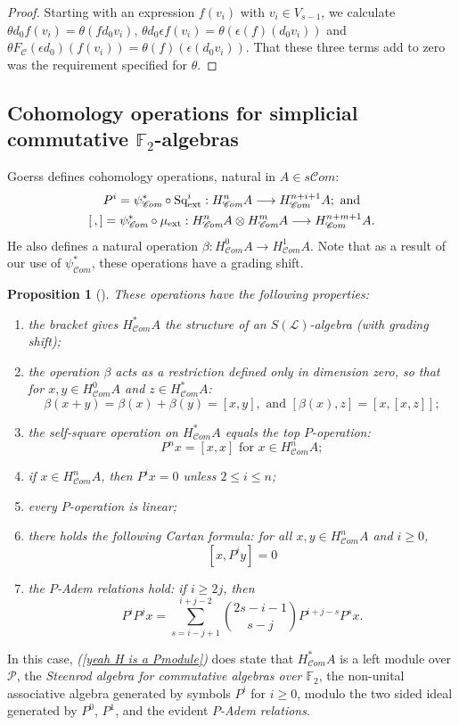 \documentclass[11pt]{amsart}
\theoremstyle{plain}
\newtheorem{prop}[thm]{Proposition}
\theoremstyle{definition}
\renewcommand{\to}{\longrightarrow}
\newcommand{\scrL}{\mathscr{L}}
\newcommand{\scrC}{\mathscr{C}}
\newcommand{\calP}{\mathcal{P}}
\newcommand{\calC}{\mathcal{C}}
\theoremstyle{plain}
\newcommand{\Palg}{{\calP}}
\newcommand{\LieOperad}{{\scrL}}
\newcommand{\ExtCohOp}{\textup{Sq}_\textup{ext}}
\newcommand{\ExtCohProd}{\mu_\textup{ext}}
\newcommand{\F}{\mathbb{F}}
\newcommand{\algs}{\scrC\!\textit{om}}
\begin{document}
\begin{Constructing homotopy and cohomotopy operations}
\begin{proof}
Starting with an expression $f(v_i)$ with $v_i\in V_{s-1}$, we calculate $\theta d_0 f(v_i)=\theta (fd_0v_i)$, $\theta d_0\epsilon f(v_i)=\theta (\epsilon (f)(d_0v_i))$ and $\theta F_{\calC}(\epsilon d_0)(f(v_i))=\theta(f)(\epsilon(d_0v_i))$. That these three terms add to zero was the requirement specified for $\theta$.
\end{proof}



\subsection{Cohomology operations for simplicial commutative $\F_2$-algebras}\label{The example of simplicial commutative F2-algebras}
Goerss \cite[\S5]{MR1089001} defines cohomology operations, natural in $A\in s \algs$:
\begin{gather*}
P^i=\psi^*_{\algs}\circ\ExtCohOp^i:H^n_{\algs}A\to H_{\algs}^{n+i+1}A;\textup{ and}\\
[\,,]=\psi^*_{\algs}\circ\ExtCohProd :H_{\algs}^nA\otimes H_{\algs}^mA\to H_{\algs}^{n+m+1}A.
\end{gather*}
He also defines a natural operation $\beta:H_{\algs}^0A\to H_{\algs}^1A$. Note that as a result of our use of $\psi^*_{\algs}$, these operations have a grading shift.
\begin{prop}[{\cite[\S5]{MR1089001}}]\label{omnibus on coh of simp algs}These operations have the following properties:
\begin{enumerate}
\item the bracket gives $H^*_{\algs}A$ the structure of an $S(\LieOperad)$-algebra (with grading shift);
\item the operation $\beta$ acts as a restriction defined only in dimension zero, so that for $x,y\in H^0_{\algs}A$ and $z\in H^*_{\algs}A$:
\[\beta(x+y)=\beta(x)+\beta(y)=[x,y],\text{\ \ and \ }[\beta(x),z]=[x,[x,z]];\]
\item the self-square operation on $H^*_{\algs}A$ equals the top $P$-operation:\[P^nx=[x,x]\text{\ \ for $x\in H^n_{\algs}A$};\]
\item \label{P unstable vanishing} if $x\in H^n_{\algs}A$, then $P^ix=0$ unless $2\leq i\leq n$;
\item every $P$-operation is linear;
\item there holds the following \emph{Cartan formula}:  for all $x,y\in   H^n_{\algs}A$ and $i\geq0$,
\[[x,P^iy]=0\]
\item \label{yeah H is a Pmodule}the \emph{$P$-Adem relations} hold: if $i\geq 2j$, then
\[P^iP^jx=\sum_{s=i-j+1}^{i+j-2}{2s-i-1\choose s-j}P^{i+j-s}P^sx.\]
\end{enumerate}
\end{prop}
In this case, \emph{(\ref{yeah H is a Pmodule})} does state that $H^*_{\algs}A$ is a left module over $\Palg$, the \emph{Steenrod algebra for commutative algebras over $\F_2$}, the non-unital associative algebra generated by symbols $P^i$ for $i\geq0$, modulo the two sided ideal generated by $P^0$, $P^1$, and the evident \emph{$P$-Adem relations}.



\end{Constructing homotopy and cohomotopy operations}
\end{document}
